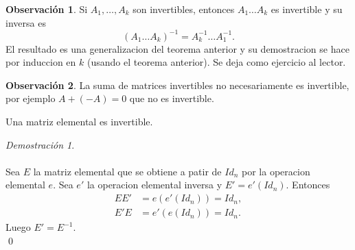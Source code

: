 \documentclass{article}
\theoremstyle{definition}
\theoremstyle{definition}
\newtheorem*{obs}{Observación}
\theoremstyle{remark}
\newtheorem*{demo}{Demostración}
\begin{document}
\begin{obs}
  Si $A_{1}, \dots, A_{k}$ son invertibles, entonces $A_{1} \dots A_{k}$ es invertible y su inversa es \[
    (A_1 \dots A_k)^{-1}=A_{k}^{-1}\dots A_{1}^{-1}.
  \]
  El resultado es una generalizacion del teorema anterior y su demostracion se hace por induccion en $k$ (usando el teorema anterior). Se deja como ejercicio al lector.
\end{obs}
\begin{obs}
La suma de matrices invertibles no necesariamente es invertible, por ejemplo $A+(-A)=0$ que no es invertible.
\end{obs}
\begin{teo}
  Una matriz elemental es invertible.
\end{teo}
\begin{demo}\;\\\\
  Sea $E$ la matriz elemental que se obtiene a patir de $Id_n$ por la operacion elemental $e$. Sea $e'$ la operacion elemental inversa y $E'=e'(Id_n)$. Entonces \[\begin{aligned}
    EE'&=e(e'(Id_n))=Id_n, \\
    E'E&=e'(e(Id_n))=Id_n.
\end{aligned}
  \]
  Luego $E'=E^{-1}$. \\
  \qed
\end{demo}
\end{document}
